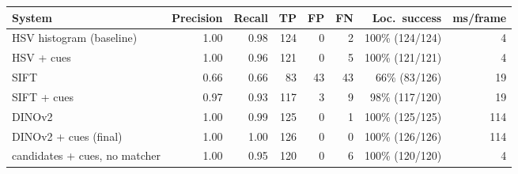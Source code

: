\begin{tabular}{lrrrrrrr}
\toprule
System & Precision & Recall & TP & FP & FN & Loc.\ success & ms/frame \\
\midrule
HSV histogram (baseline) & 1.00 & 0.98 & 124 & 0 & 2 & 100\% (124/124) & 4 \\
HSV + cues & 1.00 & 0.96 & 121 & 0 & 5 & 100\% (121/121) & 4 \\
SIFT & 0.66 & 0.66 & 83 & 43 & 43 & 66\% (83/126) & 19 \\
SIFT + cues & 0.97 & 0.93 & 117 & 3 & 9 & 98\% (117/120) & 19 \\
DINOv2 & 1.00 & 0.99 & 125 & 0 & 1 & 100\% (125/125) & 114 \\
DINOv2 + cues (final) & 1.00 & 1.00 & 126 & 0 & 0 & 100\% (126/126) & 114 \\
candidates + cues, no matcher & 1.00 & 0.95 & 120 & 0 & 6 & 100\% (120/120) & 4 \\
\bottomrule
\end{tabular}
